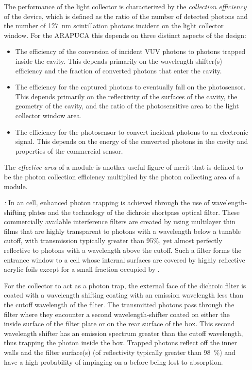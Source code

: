 The performance of the light collector is characterized by the \emph{collection efficiency} of the device, which is defined as the ratio of the number of detected photons and the number of \SI{127}{nm} scintillation photons incident on the light collector window.  For the ARAPUCA this depends on three distinct aspects of the design:
\begin{itemize}
    \item The efficiency of the conversion of incident VUV photons to photons trapped inside the cavity. This depends primarily on the wavelength shifter(s) efficiency and the fraction of converted photons that enter the cavity.
    \item The efficiency for the captured photons to eventually fall on the photosensor. This depends primarily on the reflectivity of the surfaces of the cavity, the geometry of the cavity, and the ratio of the photosensitive area to the light collector window area.
    \item The efficiency for the photosensor to convert incident photons to an electronic signal. This depends on the energy of the converted photons in the cavity and properties of the commercial sensor.
\end{itemize}
The \emph{effective area} of a  module is another useful figure-of-merit that is defined to be the photon collection efficiency multiplied by the photon collecting area of a  module. 

\textit{:} In an  cell, enhanced photon trapping is achieved through the
use of wavelength-shifting plates and the technology of the dichroic shortpass optical filter. These commercially available interference filters are created by using multilayer thin films that are highly transparent to photons with a wavelength below a tunable cutoff, 
with transmission typically greater than 95\%, yet almost perfectly reflective to photons with a wavelength above the cutoff.  Such a filter forms the entrance window to a cell whose internal surfaces are covered by highly reflective acrylic foils
except for a small fraction occupied by .

For the collector to act as a photon trap, the external face of the dichroic filter is coated with a wavelength shifting coating with an emission wavelength less than the cutoff wavelength of the filter. 
The transmitted photons pass through the filter where they encounter a second wavelength-shifter coated on either the inside surface of the filter plate or on the rear surface of the box.
This second wavelength shifter has an emission spectrum greater than the cutoff wavelength, thus trapping the photon inside the box.
Trapped photons reflect off the inner walls and the filter surface(s) (of reflectivity typically greater than \SI{98}{\%}) 
and have a high probability of impinging on a  before being lost to absorption. 

